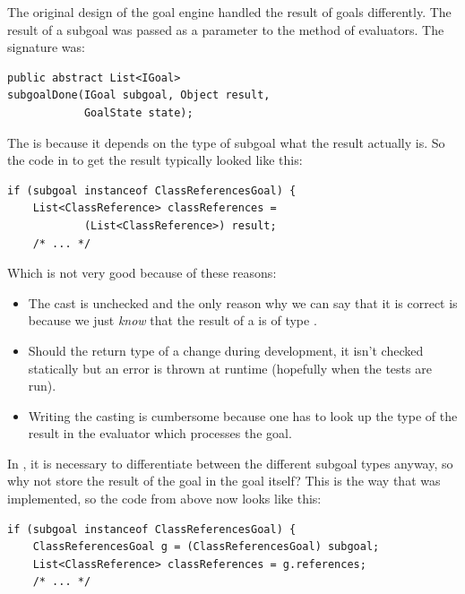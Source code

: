 \documentclass[12pt,halfparskip,DIV11,BCOR10mm]{scrreprt}
\begin{document}

The original design of the goal engine handled the result of goals differently. The result of a subgoal was passed as a parameter to the  method of evaluators. The signature was:

\begin{lstlisting}[style=java]
public abstract List<IGoal>
subgoalDone(IGoal subgoal, Object result,
            GoalState state);
\end{lstlisting}

The  is  because it depends on the type of subgoal what the result actually is. So the code in  to get the result typically looked like this:

\begin{lstlisting}[style=java]
if (subgoal instanceof ClassReferencesGoal) {
    List<ClassReference> classReferences =
            (List<ClassReference>) result;
    /* ... */
\end{lstlisting}

Which is not very good because of these reasons:

\begin{itemize}
    \item The cast is unchecked and the only reason why we can say that it is correct is because we just \emph{know} that the result of a  is of type .
    \item Should the return type of a  change during development, it isn't checked statically but an error is thrown at runtime (hopefully when the tests are run).
    \item Writing the casting is cumbersome because one has to look up the type of the result in the evaluator which processes the goal.
\end{itemize}

In , it is necessary to differentiate between the different subgoal types anyway, so why not store the result of the goal in the goal itself? This is the way that was implemented, so the code from above now looks like this:

\begin{lstlisting}[style=java]
if (subgoal instanceof ClassReferencesGoal) {
    ClassReferencesGoal g = (ClassReferencesGoal) subgoal;
    List<ClassReference> classReferences = g.references;
    /* ... */
\end{lstlisting}
\end{document}
